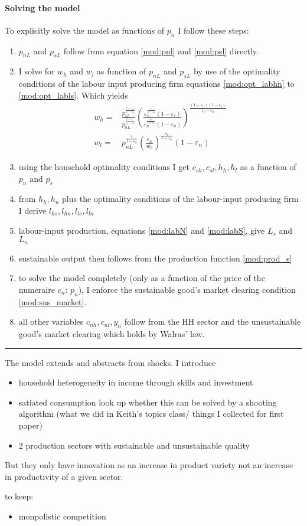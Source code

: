 \paragraph{Solving the model}
To explicitly solve the model as functions of $p_n$ I follow these steps:
\begin{enumerate}
\item $p_{nL}$ and $p_{sL}$ follow from equation \ref{mod:pnl} and \ref{mod:psl} directly. 
\item I solve for $w_h$ and $w_l$ as function of $p_{nL}$ and $p_{sL}$ by use of the optimality conditions of the labour input producing firm equations \ref{mod:opt_labhn} to \ref{mod:opt_labls}. Which yields
\begin{align}
 w_h=& \frac{p_{sL}^\frac{1-\varepsilon_n}{\varepsilon_s-\varepsilon_n}}{p_{nL}^\frac{1-\varepsilon_s}{\varepsilon_s-\varepsilon_n}}\left(\frac{\varepsilon_s^\frac{\varepsilon_s}{1-\varepsilon_s}(1-\varepsilon_s)}{\varepsilon_n^\frac{\varepsilon_n}{1-\varepsilon_n}(1-\varepsilon_n)}\right)^\frac{(1-\varepsilon_n)(1-\varepsilon_s)}{\varepsilon_s-\varepsilon_n}\\
 w_l=& p_{nL}^\frac{1}{1-\varepsilon_n}\left(\frac{\varepsilon_n}{w_h}\right)^{\frac{\varepsilon_n}{1-\varepsilon_n}}(1-\varepsilon_n)
\end{align}
\item using the household optimality conditions I get $c_{sh}, c_{sl}, h_h, h_l$ as a function of $p_n$ and $p_s$
\item from $h_h, h_n$ plus the optimality conditions of the labour-input producing firm I derive $l_{hs}, l_{hn}, l_{ls}, l_{ln}$
\item labour-input production, equations \ref{mod:labN} and \ref{mod:labS}, give $L_s$ and $L_n$
\item sustainable output then follows from the production function \ref{mod:prod_s}
\item
to solve the model completely (only as a function of the price of the numeraire $c_n$: $p_n$), I enforce
the sustainable good's market clearing condition \ref{mod:sus_market}. 
\item all other variables $c_{nh}, c_{nl}, y_n$ follow from the HH sector and the unsustainable good's market clearing which holds by Walras' law.
\end{enumerate}


\vspace{5mm}
\noindent\rule[1ex]{\textwidth}{1pt}
The model extends \cite{Bilbiie2012EndogenousCycles} and abstracts from shocks. 
I introduce
\begin{itemize}
\item household heterogeneity in income through skills and investment
\item satiated consumption \ar look up whether this can be solved by a shooting algorithm (what we did in Keith's topics class/ things I collected for first paper)
\item 2 production sectors with sustainable and unsustainable quality
\end{itemize}

But they only have innovation as an increase in product variety not an increase in productivity of a given sector.

to keep:
\begin{itemize}
\item monpolistic competition
\end{itemize}

